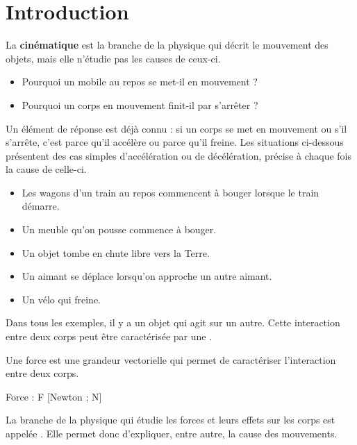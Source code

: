 \chapter{Introduction}
La \textbf{cinématique} est la branche de la physique qui décrit le mouvement des objets, mais elle n'étudie pas les causes de ceux-ci.

\begin{itemize}
      \item Pourquoi un mobile au repos se met-il en mouvement ?
      \item Pourquoi un corps en mouvement finit-il par s'arrêter ?
\end{itemize}

Un élément de réponse est déjà connu : si un corps se met en mouvement ou s'il s'arrête, c'est parce qu'il accélère ou parce qu'il freine.
Les situations ci-dessous présentent des cas simples d'accélération ou de décélération, précise à chaque fois la cause de celle-ci.



\begin{itemize}[$\Rightarrow$]
      \item Les wagons d'un train au repos commencent à bouger lorsque le train démarre.
      \item Un meuble qu'on pousse commence à bouger.
      \item Un objet tombe en chute libre vers la Terre.
      \item Un aimant se déplace lorsqu'on approche un autre aimant.
      \item Un vélo qui freine.
\end{itemize}

Dans tous les exemples, il y a un objet qui agit sur un autre. Cette interaction entre deux corps peut être caractérisée par une .
\begin{encadre}
      Une force est une grandeur vectorielle qui permet de caractériser l'interaction entre deux corps.

      Force : F [Newton ; N]
\end{encadre}

La branche de la physique qui étudie les forces et leurs effets sur les corps est appelée . Elle permet donc d'expliquer, entre autre, la cause des mouvements.

\newpage

